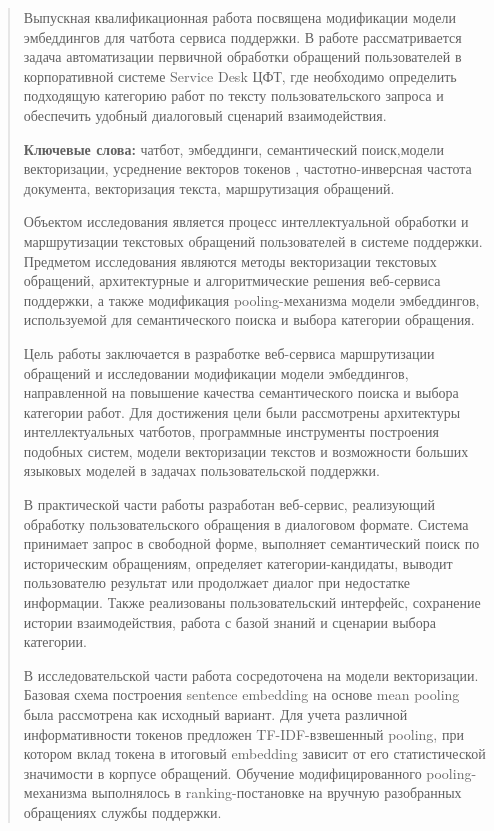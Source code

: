 \begin{quote}
Выпускная квалификационная работа посвящена модификации модели
эмбеддингов для чатбота сервиса поддержки. В работе рассматривается
задача автоматизации первичной обработки обращений пользователей в
корпоративной системе Service Desk ЦФТ, где необходимо определить
подходящую категорию работ по тексту пользовательского запроса и
обеспечить удобный диалоговый сценарий взаимодействия.

\textbf{Ключевые слова:} чатбот, эмбеддинги, семантический поиск,модели
векторизации, усреднение векторов токенов , частотно-инверсная частота
документа, векторизация текста, маршрутизация обращений.

Объектом исследования является процесс интеллектуальной обработки и
маршрутизации текстовых обращений пользователей в системе поддержки.
Предметом исследования являются методы векторизации текстовых обращений,
архитектурные и алгоритмические решения веб-сервиса поддержки, а также
модификация pooling-механизма модели эмбеддингов, используемой для
семантического поиска и выбора категории обращения.

Цель работы заключается в разработке веб-сервиса маршрутизации обращений
и исследовании модификации модели эмбеддингов, направленной на повышение
качества семантического поиска и выбора категории работ. Для достижения
цели были рассмотрены архитектуры интеллектуальных чатботов, программные
инструменты построения подобных систем, модели векторизации текстов и
возможности больших языковых моделей в задачах пользовательской
поддержки.

В практической части работы разработан веб-сервис, реализующий обработку
пользовательского обращения в диалоговом формате. Система принимает
запрос в свободной форме, выполняет семантический поиск по историческим
обращениям, определяет категории-кандидаты, выводит пользователю
результат или продолжает диалог при недостатке информации. Также
реализованы пользовательский интерфейс, сохранение истории
взаимодействия, работа с базой знаний и сценарии выбора категории.

В исследовательской части работа сосредоточена на модели векторизации.
Базовая схема построения sentence embedding на основе mean pooling была
рассмотрена как исходный вариант. Для учета различной информативности
токенов предложен TF-IDF-взвешенный pooling, при котором вклад токена в
итоговый embedding зависит от его статистической значимости в корпусе
обращений. Обучение модифицированного pooling-механизма выполнялось в
ranking-постановке на вручную разобранных обращениях службы поддержки.
\end{quote}

